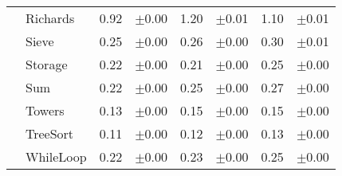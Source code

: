 \begin{tabular}{llrlrlrl}
 & Richards & 0.92 & \scriptsize\textcolor{gray!60}{$\pm$0.00} & 1.20 & \scriptsize\textcolor{gray!60}{$\pm$0.01} & 1.10 & \scriptsize\textcolor{gray!60}{$\pm$0.01} \\
 & Sieve & 0.25 & \scriptsize\textcolor{gray!60}{$\pm$0.00} & 0.26 & \scriptsize\textcolor{gray!60}{$\pm$0.00} & 0.30 & \scriptsize\textcolor{gray!60}{$\pm$0.01} \\
 & Storage & 0.22 & \scriptsize\textcolor{gray!60}{$\pm$0.00} & 0.21 & \scriptsize\textcolor{gray!60}{$\pm$0.00} & 0.25 & \scriptsize\textcolor{gray!60}{$\pm$0.00} \\
 & Sum & 0.22 & \scriptsize\textcolor{gray!60}{$\pm$0.00} & 0.25 & \scriptsize\textcolor{gray!60}{$\pm$0.00} & 0.27 & \scriptsize\textcolor{gray!60}{$\pm$0.00} \\
 & Towers & 0.13 & \scriptsize\textcolor{gray!60}{$\pm$0.00} & 0.15 & \scriptsize\textcolor{gray!60}{$\pm$0.00} & 0.15 & \scriptsize\textcolor{gray!60}{$\pm$0.00} \\
 & TreeSort & 0.11 & \scriptsize\textcolor{gray!60}{$\pm$0.00} & 0.12 & \scriptsize\textcolor{gray!60}{$\pm$0.00} & 0.13 & \scriptsize\textcolor{gray!60}{$\pm$0.00} \\
 & WhileLoop & 0.22 & \scriptsize\textcolor{gray!60}{$\pm$0.00} & 0.23 & \scriptsize\textcolor{gray!60}{$\pm$0.00} & 0.25 & \scriptsize\textcolor{gray!60}{$\pm$0.00} \\
\bottomrule
\end{tabular}
